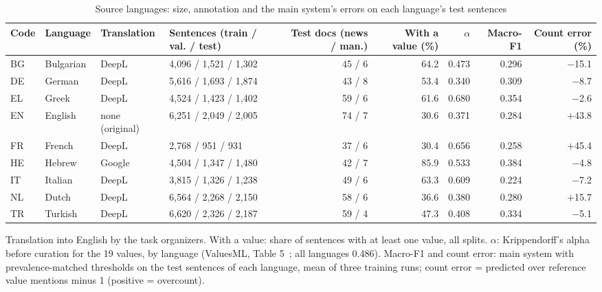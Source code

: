 \begin{table}[t]
\caption{Source languages: size, annotation and the main system's errors on each language's test sentences}
\label{tab:languages}
\centering
\footnotesize
\setlength{\tabcolsep}{4pt}
\begin{tabular*}{\textwidth}{@{\extracolsep{\fill}}llllrrrrr@{}}
\toprule
Code & Language & Translation & Sentences (train / val. / test) & Test docs (news / man.) & With a value (\%) & $\alpha$ & Macro-F1 & Count error (\%) \\
\midrule
BG & Bulgarian & DeepL & 4,096 / 1,521 / 1,302 & 45 / 6 & 64.2 & 0.473 & 0.296 & $-$15.1 \\
DE & German & DeepL & 5,616 / 1,693 / 1,874 & 43 / 8 & 53.4 & 0.340 & 0.309 & $-$8.7 \\
EL & Greek & DeepL & 4,524 / 1,423 / 1,402 & 59 / 6 & 61.6 & 0.680 & 0.354 & $-$2.6 \\
EN & English & none (original) & 6,251 / 2,049 / 2,005 & 74 / 7 & 30.6 & 0.371 & 0.284 & $+$43.8 \\
FR & French & DeepL & 2,768 / 951 / 931 & 37 / 6 & 30.4 & 0.656 & 0.258 & $+$45.4 \\
HE & Hebrew & Google & 4,504 / 1,347 / 1,480 & 42 / 7 & 85.9 & 0.533 & 0.384 & $-$4.8 \\
IT & Italian & DeepL & 3,815 / 1,326 / 1,238 & 49 / 6 & 63.3 & 0.609 & 0.224 & $-$7.2 \\
NL & Dutch & DeepL & 6,564 / 2,268 / 2,150 & 58 / 6 & 36.6 & 0.380 & 0.280 & $+$15.7 \\
TR & Turkish & DeepL & 6,620 / 2,326 / 2,187 & 59 / 4 & 47.3 & 0.408 & 0.334 & $-$5.1 \\
\bottomrule
\end{tabular*}
\par\vspace{2pt}
\begin{minipage}{\textwidth}\scriptsize Translation into English by the task organizers. With a value: share of sentences with at least one value, all splits. $\alpha$: Krippendorff's alpha before curation for the 19 values, by language (ValuesML, Table 5~\cite{Scharfbillig2026}; all languages 0.486). Macro-F1 and count error: main system with prevalence-matched thresholds on the test sentences of each language, mean of three training runs; count error = predicted over reference value mentions minus 1 (positive = overcount).\end{minipage}
\end{table}
